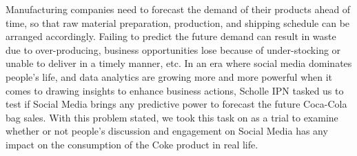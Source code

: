 \documentclass[12pt,oneside]{chicagocapstone}
\begin{document}
  \begin{executive}
    Manufacturing companies need to forecast the demand of their products ahead of time, so that raw material preparation, production, and shipping schedule can be arranged accordingly. Failing to predict the future demand can result in waste due to over-producing, business opportunities lose because of under-stocking or unable to deliver in a timely manner, etc. In an era where social media dominates people's life, and data analytics are growing more and more powerful when it comes to drawing insights to enhance business actions, Scholle IPN tasked us to test if Social Media brings any predictive power to forecast the future Coca-Cola bag sales. With this problem stated, we took this task on as a trial to examine whether or not people's discussion and engagement on Social Media has any impact on the consumption of the Coke product in real life.
    

\end{executive}
\end{document}
